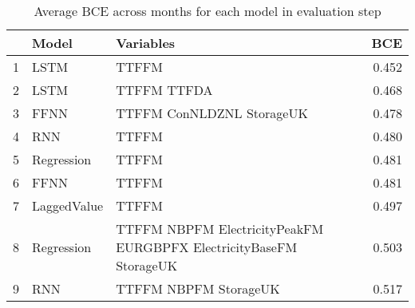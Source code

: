 \begin{table}[ht]
\centering
\begin{tabular}{rllr}
  \hline
 & Model & Variables & BCE \\ 
  \hline
1 & LSTM & TTFFM  & 0.452 \\ 
  2 & LSTM & TTFFM TTFDA & 0.468 \\ 
  3 & FFNN & TTFFM ConNLDZNL StorageUK & 0.478 \\ 
  4 & RNN & TTFFM  & 0.480 \\ 
  5 & Regression & TTFFM  & 0.481 \\ 
  6 & FFNN & TTFFM  & 0.481 \\ 
  7 & LaggedValue & TTFFM  & 0.497 \\ 
  8 & Regression & TTFFM NBPFM ElectricityPeakFM EURGBPFX ElectricityBaseFM StorageUK & 0.503 \\ 
  9 & RNN & TTFFM NBPFM StorageUK & 0.517 \\ 
   \hline
\end{tabular}
\caption{Average BCE across months for each model in evaluation step} 
\label{tab:binary.eval.short}
\end{table}
